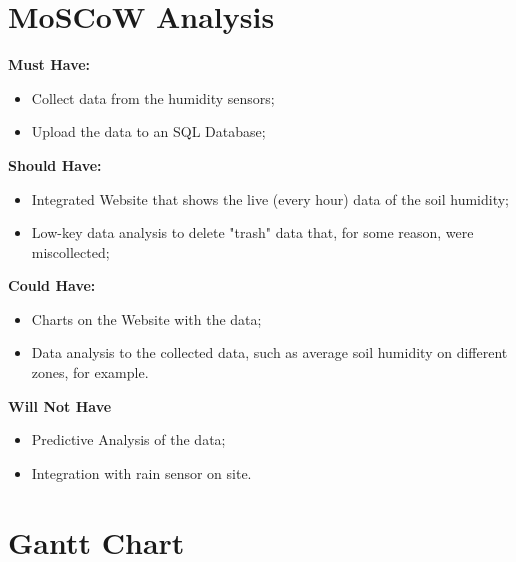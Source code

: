 \documentclass{article}
\begin{document}
\section{MoSCoW Analysis}
\textbf{Must Have:} \begin{itemize}
    \item Collect data from the humidity sensors;
    \item Upload the data to an SQL Database;
\end{itemize}
\textbf{Should Have:} \begin{itemize}
    \item Integrated Website that shows the live (every hour) data of the soil humidity;
    \item Low-key data analysis to delete "trash" data that, for some reason, were miscollected;
\end{itemize}
\textbf{Could Have:} \begin{itemize}
    \item Charts on the Website with the data;
    \item Data analysis to the collected data, such as average soil humidity on different zones, for example.
\end{itemize}
\textbf{Will Not Have} \begin{itemize}
    \item Predictive Analysis of the data;
    \item Integration with rain sensor on site.
\end{itemize}
\newpage
{}

\section{Gantt Chart}
\end{document}
